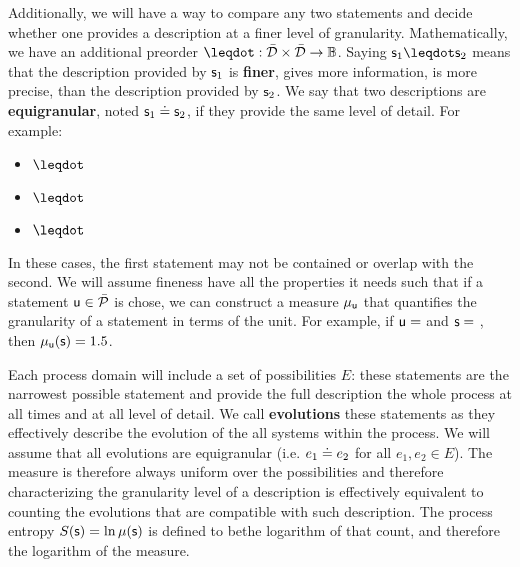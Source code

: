 \documentclass[10pt, onecolumn, longbibliography, nofootinbib]{revtex4-2}
\begin{document}
Additionally, we will have a way to compare any two statements and decide whether one provides a description at a finer level of granularity. Mathematically, we have an additional preorder $\finer : \tdomain \times \tdomain \to \mathbb{B}$. Saying $\stmt_1 \finer \stmt_2$ means that the description provided by $\stmt_1$ is \textbf{finer}, gives more information, is more precise, than the description provided by $\stmt_2$. We say that two descriptions are \textbf{equigranular}, noted $\stmt_1 \eqgran \stmt_2$, if they provide the same level of detail. For example:
\begin{itemize}
    \item {} $\finer$ 
    \item {} $\finer$ 
    \item {} $\finer$ 
\end{itemize}
In these cases, the first statement may not be contained or overlap with the second. We will assume fineness have all the properties it needs such that if a statement $\stmt[u] \in \tdomain[P]$ is chose, we can construct a measure $\mu_{\stmt[u]}$ that quantifies the granularity of a statement in terms of the unit. For example, if $\stmt[u]=$  and $\stmt=$ , then $\mu_{\stmt[u]}(\stmt) = 1.5$.

Each process domain will include a set of possibilities $E$: these statements are the narrowest possible statement and provide the full description the whole process at all times and at all level of detail. We call \textbf{evolutions} these statements as they effectively describe the evolution of the all systems within the process. We will assume that all evolutions are equigranular (i.e. $e_1 \eqgran e_2$ for all $e_1, e_2 \in E$). The measure is therefore always uniform over the possibilities and therefore characterizing the granularity level of a description is effectively equivalent to counting the evolutions that are compatible with such description. The process entropy $S(\stmt) = \ln \mu (\stmt)$ is defined to bethe logarithm of that count, and therefore the logarithm of the measure.
\end{document}
